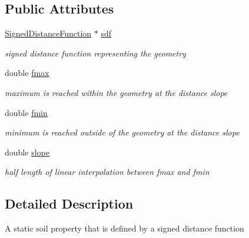 \subsection*{Public Attributes}
\begin{DoxyCompactItemize}
\item 
\mbox{\label{classCPlantBox_1_1SoilLookUpSDF_a4836a2ca3aaa4c6a43a3643cb3e60b04}} 
\hyperlink{classCPlantBox_1_1SignedDistanceFunction}{Signed\+Distance\+Function} $\ast$ \hyperlink{classCPlantBox_1_1SoilLookUpSDF_a4836a2ca3aaa4c6a43a3643cb3e60b04}{sdf}
\begin{DoxyCompactList}\small\item\em signed distance function representing the geometry \end{DoxyCompactList}\item 
\mbox{\label{classCPlantBox_1_1SoilLookUpSDF_a02132f8ebc1dc2d31f0a499520523a3f}} 
double \hyperlink{classCPlantBox_1_1SoilLookUpSDF_a02132f8ebc1dc2d31f0a499520523a3f}{fmax}
\begin{DoxyCompactList}\small\item\em maximum is reached within the geometry at the distance slope \end{DoxyCompactList}\item 
\mbox{\label{classCPlantBox_1_1SoilLookUpSDF_a51fa9f37642ca632cbd075f220585ab6}} 
double \hyperlink{classCPlantBox_1_1SoilLookUpSDF_a51fa9f37642ca632cbd075f220585ab6}{fmin}
\begin{DoxyCompactList}\small\item\em minimum is reached outside of the geometry at the distance slope \end{DoxyCompactList}\item 
\mbox{\label{classCPlantBox_1_1SoilLookUpSDF_ae5f9b5dfd0fa93d480cf18856b043c68}} 
double \hyperlink{classCPlantBox_1_1SoilLookUpSDF_ae5f9b5dfd0fa93d480cf18856b043c68}{slope}
\begin{DoxyCompactList}\small\item\em half length of linear interpolation between fmax and fmin \end{DoxyCompactList}\end{DoxyCompactItemize}


\subsection{Detailed Description}
A static soil property that is defined by a signed distance function 

